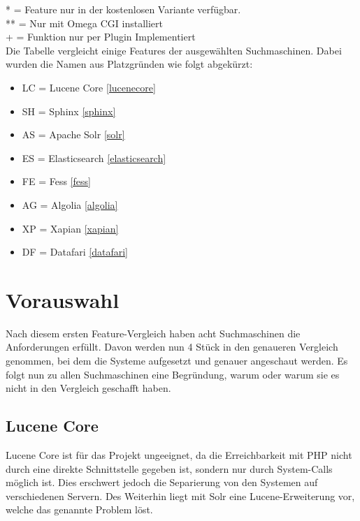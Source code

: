 \begin{table}[hbtp]
    *  = Feature nur in der kostenlosen Variante verfügbar. \\
    ** = Nur mit Omega CGI installiert \\
    + = Funktion nur per Plugin Implementiert \\

    Die Tabelle vergleicht einige Features der ausgewählten Suchmaschinen. Dabei wurden die Namen aus Platzgründen wie folgt abgekürzt:

    \begin{itemize}
        \item LC = Lucene Core \ref{lucenecore}
        \item SH = Sphinx \ref{sphinx}
        \item AS = Apache Solr \ref{solr}
        \item ES = Elasticsearch \ref{elasticsearch}
        \item FE = Fess \ref{fess}
        \item AG = Algolia \ref{algolia}
        \item XP = Xapian \ref{xapian}
        \item DF = Datafari \ref{datafari}
    \end{itemize} 


\end{table}

\section{Vorauswahl}

Nach diesem ersten Feature-Vergleich haben acht Suchmaschinen die Anforderungen erfüllt. Davon werden nun 4 Stück in den genaueren Vergleich genommen, bei dem die Systeme aufgesetzt und genauer angeschaut werden. Es folgt nun zu allen Suchmaschinen eine Begründung, warum oder warum sie es nicht in den Vergleich geschafft haben.

\subsection{Lucene Core}


Lucene Core ist für das Projekt ungeeignet, da die Erreichbarkeit mit PHP nicht durch eine direkte Schnittstelle gegeben ist, sondern nur durch System-Calls möglich ist. Dies erschwert jedoch die Separierung von den Systemen auf verschiedenen Servern. Des Weiterhin liegt mit Solr eine Lucene-Erweiterung vor, welche das genannte Problem löst. \cite{TheApacheSoftwareFoundation.2019b}

